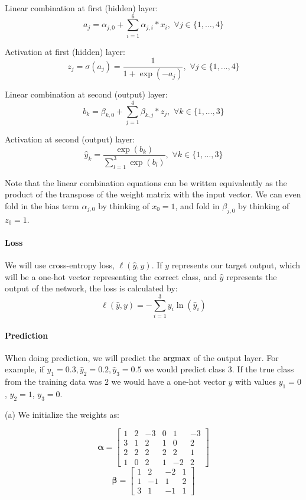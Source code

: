 Linear combination at first (hidden) layer:
$$a_j= \alpha_{j,0} + \sum_{i=1}^6 \alpha_{j,i}*x_i,\,\, \forall j \in \{1,\ldots,4\}$$

Activation at first (hidden) layer:
$$z_j = \sigma(a_j) = \frac{1}{1+\exp(-a_j)},\,\, \forall j \in \{1,\ldots,4\}$$

Linear combination at second (output) layer:
$$b_k = \beta_{k,0} + \sum_{j=1}^4 \beta_{k,j}*z_j,\,\, \forall k \in \{1,\ldots,3\}$$

Activation at second (output) layer:
$$\hat{y}_k = \frac{\exp(b_k)}{\sum\limits_{l=1}^3 \exp(b_l)},\,\, \forall k \in \{1,\ldots,3\}$$

Note that the linear combination equations can be written equivalently as the product of the transpose of the weight matrix with the input vector. We can even fold in the bias term $\alpha_{j,0}$ by thinking of $x_0 = 1$, and fold in $\beta_{j,0}$ by thinking of $z_0 = 1$.

\paragraph{Loss}

We will use cross-entropy loss, $\ell(\hat{y},y)$. If $y$ represents our target output, which will be a one-hot vector representing the correct class, and $\hat{y}$ represents the output of the network, the loss is calculated by:
$$\ell(\hat{y},y) = - \sum_{i=1}^3 y_i \ln(\hat{y}_i)$$

\paragraph{Prediction}
When doing prediction, we will predict the $\mathop{\rm argmax}$ of the output layer. For example, if $\hat{y}_1=0.3, \hat{y}_2=0.2, \hat{y}_3=0.5$ we would predict class 3. If the true class from the training data was $2$ we would have a one-hot vector $y$ with values $y_1=0$, $y_2=1$, $y_3=0$.

(a)  We initialize the weights as:
\begin{center}
$$\boldsymbol{\alpha}=
    \begin{bmatrix}
    1 & 2 & -3 & 0 & 1 & -3 \\
    3 & 1 & 2 & 1 & 0 & 2 \\
    2 & 2 & 2 & 2 & 2 & 1 \\
    1 & 0 & 2 & 1 & -2 & 2
    \end{bmatrix}$$
$$\boldsymbol{\beta}=
    \begin{bmatrix}
    1 & 2 & -2 & 1 \\
    1 & -1 & 1 & 2 \\
    3 & 1 & -1 & 1
    \end{bmatrix}
$$
\end{center}

